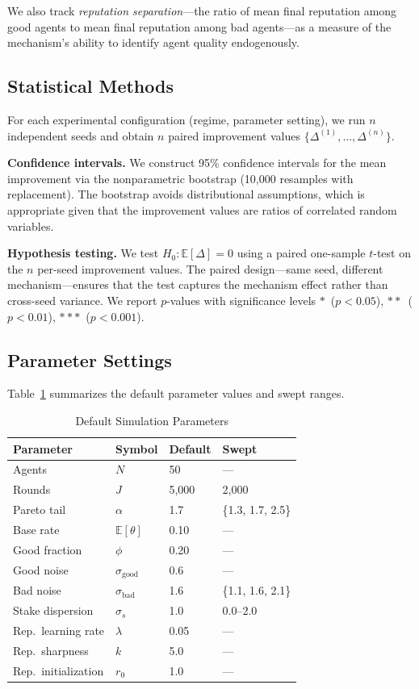 \documentclass[conference]{IEEEtran}
\begin{document}
We also track \emph{reputation separation}---the ratio of mean final reputation among good agents to mean final reputation among bad agents---as a measure of the mechanism's ability to identify agent quality endogenously.

\subsection{Statistical Methods}
\label{sec:experiments-stats}

For each experimental configuration (regime, parameter setting), we run $n$ independent seeds and obtain $n$ paired improvement values $\{\Delta^{(1)}, \dots, \Delta^{(n)}\}$.

\textbf{Confidence intervals.} We construct 95\% confidence intervals for the mean improvement via the nonparametric bootstrap (10,000 resamples with replacement). The bootstrap avoids distributional assumptions, which is appropriate given that the improvement values are ratios of correlated random variables.

\textbf{Hypothesis testing.} We test $H_0\!: \mathbb{E}[\Delta] = 0$ using a paired one-sample $t$-test on the $n$ per-seed improvement values. The paired design---same seed, different mechanism---ensures that the test captures the mechanism effect rather than cross-seed variance. We report $p$-values with significance levels $*$~($p < 0.05$), $**$~($p < 0.01$), $***$~($p < 0.001$).

\subsection{Parameter Settings}
\label{sec:experiments-params}

Table~\ref{tab:params} summarizes the default parameter values and swept ranges.

\begin{table}[t]
\centering
\caption{Default Simulation Parameters}
\label{tab:params}
\begin{tabular}{@{}llll@{}}
\toprule
\textbf{Parameter} & \textbf{Symbol} & \textbf{Default} & \textbf{Swept} \\
\midrule
Agents & $N$ & 50 & --- \\
Rounds & $J$ & 5{,}000 & 2{,}000 \\
Pareto tail & $\alpha$ & 1.7 & \{1.3, 1.7, 2.5\} \\
Base rate & $\mathbb{E}[\theta]$ & 0.10 & --- \\
Good fraction & $\phi$ & 0.20 & --- \\
Good noise & $\sigma_{\text{good}}$ & 0.6 & --- \\
Bad noise & $\sigma_{\text{bad}}$ & 1.6 & \{1.1, 1.6, 2.1\} \\
Stake dispersion & $\sigma_s$ & 1.0 & 0.0--2.0 \\
Rep.\ learning rate & $\lambda$ & 0.05 & --- \\
Rep.\ sharpness & $k$ & 5.0 & --- \\
Rep.\ initialization & $r_0$ & 1.0 & --- \\
\bottomrule
\end{tabular}
\end{table}
\end{document}
